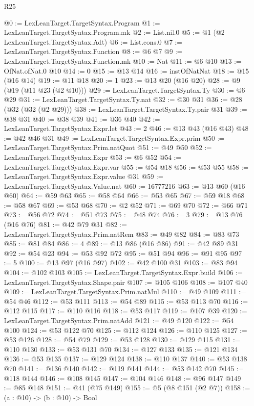 \begin{lexlean}{R25}
\begin{coremodule}
@0 := LexLeanTarget.TargetSyntax.Program
@1 := LexLeanTarget.TargetSyntax.Program.mk
@2 := List.nil.{0}
@5 := @1 (@2 LexLeanTarget.TargetSyntax.Adt)
@6 := List.cons.{0}
@7 := LexLeanTarget.TargetSyntax.Function
@8 := @6 @7
@9 := LexLeanTarget.TargetSyntax.Function.mk
@10 := Nat
@11 := @6 @10
@13 := OfNat.ofNat.{0} @10
@14 := 0
@15 := @13 @14
@16 := instOfNatNat
@18 := @15 (@16 @14)
@19 := @11 @18
@20 := 1
@23 := @13 @20 (@16 @20)
@28 := @9 (@19 (@11 @23 (@2 @10)))
@29 := LexLeanTarget.TargetSyntax.Ty
@30 := @6 @29
@31 := LexLeanTarget.TargetSyntax.Ty.nat
@32 := @30 @31
@36 := @28 (@32 (@32 (@2 @29)))
@38 := LexLeanTarget.TargetSyntax.Ty.pair @31
@39 := @38 @31
@40 := @38 @39
@41 := @36 @40
@42 := LexLeanTarget.TargetSyntax.Expr.let
@43 := 2
@46 := @13 @43 (@16 @43)
@48 := @42 @46 @31
@49 := LexLeanTarget.TargetSyntax.Expr.prim
@50 := LexLeanTarget.TargetSyntax.Prim.natQuot
@51 := @49 @50
@52 := LexLeanTarget.TargetSyntax.Expr
@53 := @6 @52
@54 := LexLeanTarget.TargetSyntax.Expr.var
@55 := @54 @18
@56 := @53 @55
@58 := LexLeanTarget.TargetSyntax.Expr.value @31
@59 := LexLeanTarget.TargetSyntax.Value.nat
@60 := 16777216
@63 := @13 @60 (@16 @60)
@64 := @59 @63
@65 := @58 @64
@66 := @53 @65
@67 := @59 @18
@68 := @58 @67
@69 := @53 @68
@70 := @2 @52
@71 := @69 @70
@72 := @66 @71
@73 := @56 @72
@74 := @51 @73
@75 := @48 @74
@76 := 3
@79 := @13 @76 (@16 @76)
@81 := @42 @79 @31
@82 := LexLeanTarget.TargetSyntax.Prim.natRem
@83 := @49 @82
@84 := @83 @73
@85 := @81 @84
@86 := 4
@89 := @13 @86 (@16 @86)
@91 := @42 @89 @31
@92 := @54 @23
@94 := @53 @92 @72
@95 := @51 @94
@96 := @91 @95
@97 := 5
@100 := @13 @97 (@16 @97)
@102 := @42 @100 @31
@103 := @83 @94
@104 := @102 @103
@105 := LexLeanTarget.TargetSyntax.Expr.build
@106 := LexLeanTarget.TargetSyntax.Shape.pair
@107 := @105 @106
@108 := @107 @40
@109 := LexLeanTarget.TargetSyntax.Prim.natMul
@110 := @49 @109
@111 := @54 @46
@112 := @53 @111
@113 := @54 @89
@115 := @53 @113 @70
@116 := @112 @115
@117 := @110 @116
@118 := @53 @117
@119 := @107 @39
@120 := LexLeanTarget.TargetSyntax.Prim.natAdd
@121 := @49 @120
@122 := @54 @100
@124 := @53 @122 @70
@125 := @112 @124
@126 := @110 @125
@127 := @53 @126
@128 := @54 @79
@129 := @53 @128
@130 := @129 @115
@131 := @110 @130
@133 := @53 @131 @70
@134 := @127 @133
@135 := @121 @134
@136 := @53 @135
@137 := @129 @124
@138 := @110 @137
@140 := @53 @138 @70
@141 := @136 @140
@142 := @119 @141
@144 := @53 @142 @70
@145 := @118 @144
@146 := @108 @145
@147 := @104 @146
@148 := @96 @147
@149 := @85 @148
@151 := @41 (@75 @149)
@155 := @5 (@8 @151 (@2 @7))
@158 := (a : @10) -> (b : @10) -> Bool

\end{coremodule}
\end{lexlean}
